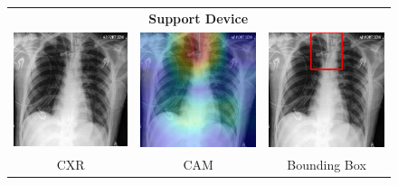 \begin{figure}[htbp!]
\centering
\begin{tabular}{ccc}
 &\textbf{Support Device}& \\
\vspace{2mm}
  \includegraphics[width=35mm]{Tesi/images/CAMs/CAM1/image.png} &   
  \includegraphics[width=35mm]{Tesi/images/CAMs/CAM1/image_cam.png} &   
  \includegraphics[width=35mm]{Tesi/images/CAMs/CAM1/image_bbox.png} \\
\footnotesize{CXR} & \footnotesize{CAM} & \footnotesize{Bounding Box} \\[6pt]
\end{tabular}
\caption[Support Device CAM-2]{}
\label{fig:figure_5.16}
\end{figure}

